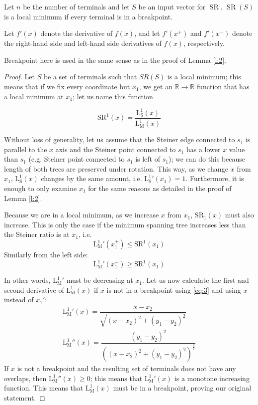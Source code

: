 \documentclass{mpaper}
\begin{document}
\begin{lemma}
  \label{l:1}
  Let $n$ be the number of terminals and let $S$ be an input vector for $\operatorname{SR}$. $\operatorname{SR}(S)$ is a local minimum if every terminal is in a breakpoint.
\end{lemma}
\begin{remark}
  Let $f'(x)$ denote the derivative of $f(x)$, and let $f'(x^+)$ and $f'(x^-)$ denote the right-hand side and left-hand side derivatives of $f(x)$, respectively.

  Breakpoint here is used in the same sense as in the proof of Lemma \ref{l:2}.
\end{remark}
\begin{proof}
  Let $S$ be a set of terminals such that $SR(S)$ is a local minimum; this means that if we fix every coordinate but $x_1$, we get an $\mathbb{R}\rightarrow \mathbb{R}$ function that has a local minimum at $x_1$; let us name this function 
  
  $$\operatorname{SR^1}(x)=\frac{\operatorname{L_S^1}(x)}{\operatorname{L_M^1}(x)}$$
  
  Without loss of generality, let us assume that the Steiner edge connected to $s_1$ is parallel to the $x$ axis and the Steiner point connected to $s_1$ has a lower $x$ value than $s_1$ (e.g. Steiner point connected to $s_1$ is left of $s_1$); we can do this because length of both trees are preserved under rotation. This way, as we change $x$ from $x_1$, $\operatorname{L_S^1}(x)$ changes by the same amount, i.e. $\operatorname{L_S^1}'(x_1)=1$. Furthermore, it is enough to only examine $x_1$ for the same reasons as detailed in the proof of Lemma \ref{l:2}.

  Because we are in a local minimum, as we increase $x$ from $x_1$, $\operatorname{SR_1}(x)$ must also increase. This is only the case if the minimum spanning tree increases less than the Steiner ratio is at $x_1$, i.e.
  \[
    \operatorname{L_M^1}'(x_1^+)\leq\operatorname{SR^1}(x_1)
  \]
  Similarly from the left side:
  \[
    \operatorname{L_M^1}'(x_1^-)\geq\operatorname{SR^1}(x_1)
  \]

  In other words, $\operatorname{L_M^1}'$ must be decreasing at $x_1$. Let us now calculate the first and second derivative of $\operatorname{L_M^1}(x)$ if $x$ is not in a breakpoint using \eqref{eq:3} and using $x$ instead of $x_1'$:
  \begin{eqnarray}
    \operatorname{L_M^1}'(x) =\dfrac{x-x_2}{\sqrt{\left(x-x_2\right)^2+\left(y_1-y_2\right)^2}}\\
    \operatorname{L_M^1}''(x) =\dfrac{\left(y_1-y_2\right)^2}{\left(\left(x-x_2\right)^2+\left(y_1-y_2\right)^2\right)^\frac{3}{2}}  
  \end{eqnarray} 
  If $x$ is not a breakpoint and the resulting set of terminals does not have any overlaps, then $\operatorname{L_M^1}''(x)\geq 0$; this means that  $\operatorname{L_M^1}'(x)$ is a monotone increasing function. This means that $\operatorname{L_M^1}(x)$ must be in a breakpoint, proving our original statement.
\end{proof}
\end{document}
